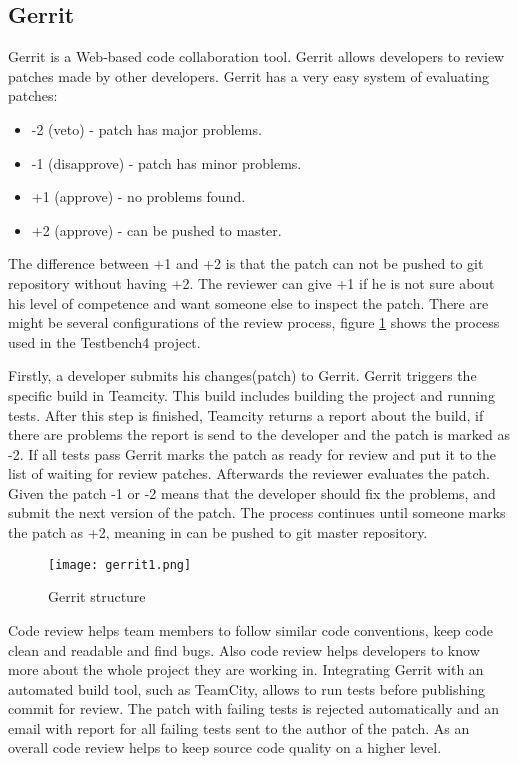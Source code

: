 \subsection{Gerrit}
\label{sec:gerrit}
  Gerrit is a Web-based code collaboration tool. Gerrit allows developers to
  review patches made by other developers. Gerrit has a very easy system of evaluating patches:
  \begin{itemize}
  \item -2 (veto) - patch has major problems.
  \item -1 (disapprove) - patch has minor problems.
  \item +1 (approve) - no problems found.
  \item +2 (approve) - can be pushed to master.
  \end{itemize}
  
  The difference between +1 and +2 is that the patch can not be pushed to git
  repository without having +2. The reviewer can give +1 if he is not sure about his level of competence
  and want someone else to inspect the patch. 
  There are might be several configurations of the review process,
  figure \ref{fig:gerritTestbench} shows the process used in the
  Testbench4 project.

  Firstly, a developer submits his changes(patch) to Gerrit. Gerrit triggers the
  specific build in Teamcity. This build includes building the project and
  running tests. After this step is finished, Teamcity returns a report about the build,
  if there are problems the report is send to the developer and the patch is marked as -2. If all
  tests pass Gerrit marks the patch as ready for review and put it to the list
  of waiting for review patches.
  Afterwards the reviewer evaluates the patch. Given the patch -1 or -2 means
  that the developer should fix the problems, and submit the next version of the patch. 
  The process continues until someone  marks the patch as +2,
    meaning in can be pushed to git master repository.
    \begin{figure}
    \centering
      \texttt{[image: gerrit1.png]}
      \caption{Gerrit structure}
      \label{fig:gerritTestbench}
    \end{figure}
    
  Code review helps team members to follow similar code conventions, 
  keep code clean and readable and find bugs. Also code review helps developers to know more about 
  the whole project they are working in. Integrating Gerrit with an automated build tool, 
  such as TeamCity, allows to run tests before publishing commit for review. 
  The patch with failing tests is rejected automatically and an email with report
   for all failing tests sent to the author of the patch. 
   As an overall code review helps to keep source code quality on a higher level.

